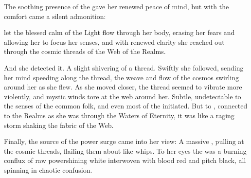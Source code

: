 The soothing presence of the \Archons{} gave her renewed peace of mind, %
but with the comfort came a silent admonition:  

% 

\Esmerel{} let the blessed calm of the Light flow through her body, erasing her fears and allowing her to focus her senses, and with renewed clarity she reached out through the cosmic threads of the Web of the Realms. 

And she detected it. A slight shivering of a thread. 
Swiftly she followed, sending her mind speeding along the thread, the weave and flow of the cosmos swirling around her as she flew. 
As she moved closer, the thread seemed to vibrate more violently, and mystic winds tore at the web around her. Subtle, undetectable to the senses of the common folk, and even most of the initiated. But to \Esmerel, connected to the Realms as she was through the Waters of Eternity, it was like a raging storm shaking the fabric of the Web. 

Finally, the source of the power surge came into her view: A massive \vertex{}, pulling at the cosmic threads, flailing them about like whips. To her eyes the \vertex{} was a burning conflux of raw power\dash shining white interwoven with blood red and pitch black, all spinning in chaotic confusion. 

